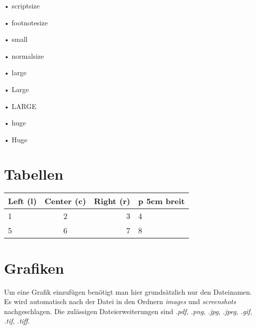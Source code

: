 \begin{scriptsize}
• scriptsize
\end{scriptsize}

\begin{footnotesize}
• footnotesize
\end{footnotesize}

\begin{small}
• small
\end{small}

\begin{normalsize}
• normalsize
\end{normalsize}

\begin{large}
• large
\end{large}

\begin{Large}
• Large
\end{Large}

\begin{LARGE}
• LARGE
\end{LARGE}

\begin{huge}
• huge
\end{huge}

\begin{Huge}
• Huge
\end{Huge}

\section{Tabellen}\label{sec:tabellen}

\begin{table}[ht]
	\centering
	\label{tab:matrix}
	\begin{tabular}{ | l | c | r | p{5cm} | }
		\hline
		\textbf{Left (l)} & \textbf{Center (c)} & \textbf{Right (r)} & \textbf{p 5cm breit}\\
		\hline
		1 & 2 & 3 & 4\\
		\hline
		5 & 6 & 7 & 8\\
		\hline
	\end{tabular}
\end{table}

\section{Grafiken}\label{sec:grafiken}

Um eine Grafik einzufügen benötigt man hier grundsätzlich nur den Dateinamen. Es wird automatisch nach der Datei in den Ordnern \textit{images} und \textit{screenshots} nachgeschlagen. Die zulässigen Dateierweiterungen sind \textit{.pdf}, \textit{.png}, \textit{.jpg}, \textit{.jpeg}, \textit{.gif}, \textit{.tif}, \textit{.tiff}.\par

